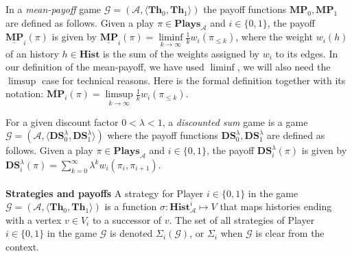 In a \textit{mean-payoff} game $\mathcal{G} = (\mathcal{A},\langle \mathbf{Th}_0, \mathbf{Th}_1\rangle)$ the payoff functions $\mathbf{MP}_0, \mathbf{MP}_1$ are defined as follows. Given a play $\pi \in \mathbf{Plays}_{\mathcal{A}}$ and $i \in \{0,1\}$, the payoff $\underline{\mathbf{MP}}_i(\pi)$ is given by $\underline{\mathbf{MP}}_i(\pi) = \liminf\limits_{k \to \infty} \frac{1}{k}w_i(\pi_{\leqslant k}) $, where the weight $w_i(h)$ of an history $h \in \mathbf{Hist}$ is the sum of the weights assigned by $w_i$ to its edges. In our definition of the mean-payoff, we have used $\liminf$, we will also need the $\limsup$ case for technical reasons. Here is the formal definition together with its notation: $\overline{\mathbf{MP}}_i(\pi) = \limsup\limits_{k \to \infty} \frac{1}{k}w_i(\pi_{\leqslant k}) $.

For a given discount factor $0 < \lambda < 1$, a \textit{discounted sum} game is a game $\mathcal{G} = (\mathcal{A},\langle \mathbf{DS}^{\lambda}_0, \mathbf{DS}^{\lambda}_1\rangle)$ where the payoff functions $\mathbf{DS}^{\lambda}_0, \mathbf{DS}^{\lambda}_1$ are defined as follows. Given a play $\pi \in \mathbf{Plays}_{\mathcal{A}}$ and $i \in \{0,1\}$, the payoff $\mathbf{DS}^{\lambda}_i(\pi)$ is given by $\mathbf{DS}^{\lambda}_i(\pi) = \sum^{\infty}_{k=0}\lambda^k w_i(\pi_i, \pi_{i+1})$.
\\
\\
\textbf{Strategies and payoffs} A strategy for Player $i \in \{0,1\}$ in the game $\mathcal{G} = (\mathcal{A},\langle \mathbf{Th}_0, \mathbf{Th}_1\rangle)$ is a function $\sigma: \mathbf{Hist}^i_{\mathcal{A}} \mapsto V$ that maps histories ending with a vertex $v \in V_i$ to a successor of $v$. The set of all strategies of Player $i \in \{0,1\}$ in the game $\mathcal{G}$ is denoted $\Sigma_i(\mathcal{G})$, or $\Sigma_i$ when $\mathcal{G}$ is clear from the context.

